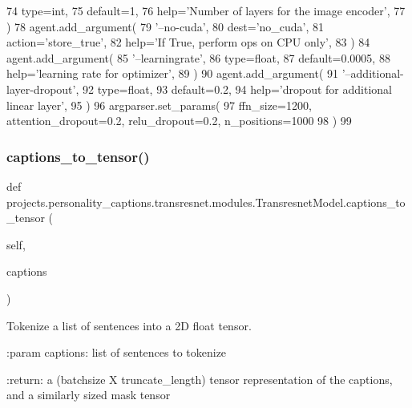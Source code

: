 \begin{DoxyCode}
74             type=int,
75             default=1,
76             help=\textcolor{stringliteral}{'Number of layers for the image encoder'},
77         )
78         agent.add\_argument(
79             \textcolor{stringliteral}{'--no-cuda'},
80             dest=\textcolor{stringliteral}{'no\_cuda'},
81             action=\textcolor{stringliteral}{'store\_true'},
82             help=\textcolor{stringliteral}{'If True, perform ops on CPU only'},
83         )
84         agent.add\_argument(
85             \textcolor{stringliteral}{'--learningrate'},
86             type=float,
87             default=0.0005,
88             help=\textcolor{stringliteral}{'learning rate for optimizer'},
89         )
90         agent.add\_argument(
91             \textcolor{stringliteral}{'--additional-layer-dropout'},
92             type=float,
93             default=0.2,
94             help=\textcolor{stringliteral}{'dropout for additional linear layer'},
95         )
96         argparser.set\_params(
97             ffn\_size=1200, attention\_dropout=0.2, relu\_dropout=0.2, n\_positions=1000
98         )
99 
\end{DoxyCode}
\mbox{\label{classprojects_1_1personality__captions_1_1transresnet_1_1modules_1_1TransresnetModel_a923aaf397f8832bea4fcb82acc963465}} 
\subsubsection{\texorpdfstring{captions\+\_\+to\+\_\+tensor()}{captions\_to\_tensor()}}
{\footnotesize\ttfamily def projects.\+personality\+\_\+captions.\+transresnet.\+modules.\+Transresnet\+Model.\+captions\+\_\+to\+\_\+tensor (\begin{DoxyParamCaption}\item[{}]{self,  }\item[{}]{captions }\end{DoxyParamCaption})}

\begin{DoxyVerb}Tokenize a list of sentences into a 2D float tensor.

:param captions:
    list of sentences to tokenize

:return:
    a (batchsize X truncate_length) tensor representation of the captions,
    and a similarly sized mask tensor
\end{DoxyVerb}
 

